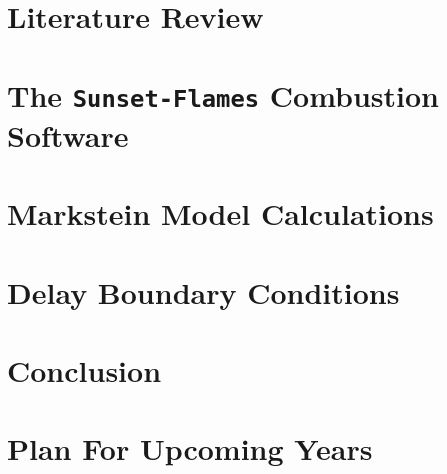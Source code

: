 \documentclass[lmr,second,hyperref,rgb,hyperref,dvipsnames]{uom_thesis_casson}
\begin{document}
\makeatletter
\title{\xmp@Title}
\author{\xmp@Author}
\makeatother

\maketitle




\uomtoc


\uomstartmainbody %


\chapter{Literature Review} \label{ch:lit-review}


\chapter{The \texttt{Sunset-Flames} Combustion Software} \label{ch:sunset}


\chapter{Markstein Model Calculations} \label{ch:markstein}


\chapter{Delay Boundary Conditions} \label{ch:delay-bcs}


\chapter{Conclusion} \label{ch:conc}


\chapter{Plan For Upcoming Years} \label{ch:plan}



\printbibliography[title={References},heading=bibintoc]
\end{document}
